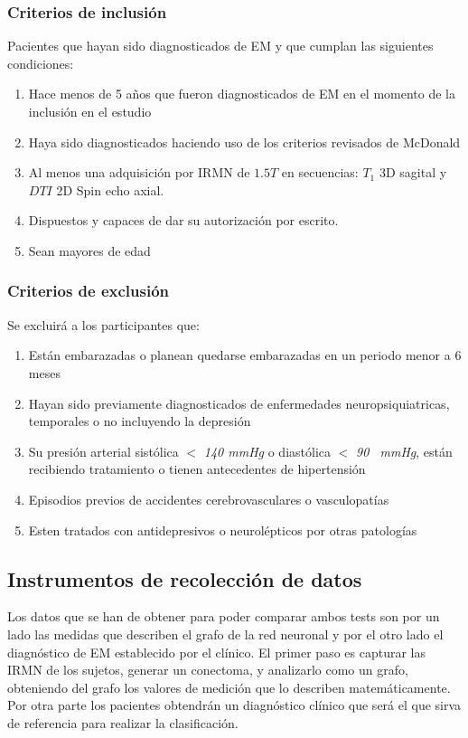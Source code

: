 \documentclass[fleqn,12pt]{uicarticle} %
\begin{document}
\subsubsection{Criterios de inclusión}
Pacientes que hayan sido diagnosticados de EM y que cumplan las siguientes condiciones:
\begin{enumerate}[noitemsep]
\item Hace menos de 5 años que fueron diagnosticados de EM en el momento de la inclusión en el estudio
\item Haya sido diagnosticados haciendo uso de los criterios revisados de McDonald
\item Al menos una adquisición por IRMN de $1.5T$ en secuencias: $T_1$ 3D sagital y $DTI$ 2D Spin echo axial.
\item Dispuestos y capaces de dar su autorización por escrito.
\item Sean mayores de edad
\end{enumerate}

\subsubsection{Criterios de exclusión}
Se excluirá a los participantes que:
\begin{enumerate}[noitemsep]
\item Están embarazadas o planean quedarse embarazadas en un periodo menor a 6 meses
\item Hayan sido previamente diagnosticados de enfermedades neuropsiquiatricas, temporales o no incluyendo la depresión
\item Su presión arterial sistólica $<$ \textit{140 mmHg} o diastólica $<$ \textit{90 ~mmHg}, están recibiendo tratamiento o tienen antecedentes de hipertensión
\item Episodios previos de accidentes cerebrovasculares o vasculopatías
\item Esten tratados con antidepresivos o neurolépticos por otras patologías
\end{enumerate}


\subsection{Instrumentos de recolección de datos}

Los datos que se han de obtener para poder comparar ambos tests son por un lado las medidas que describen el grafo de la red neuronal y por el otro lado el diagnóstico de EM establecido por el clínico. El primer paso es capturar las IRMN de los sujetos, generar un conectoma, y analizarlo como un grafo, obteniendo del grafo los valores de medición que lo describen matemáticamente. Por otra parte los pacientes obtendrán un diagnóstico clínico que será el que sirva de referencia para realizar la clasificación.
\end{document}
